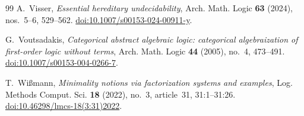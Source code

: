 \begin{thebibliography}{99}
A.~Visser, \emph{Essential hereditary undecidability},
Arch. Math. Logic \textbf{63} (2024), nos.~5--6, 529--562.
\href{https://doi.org/10.1007/s00153-024-00911-y}{doi:10.1007/s00153-024-00911-y}.

G.~Voutsadakis, \emph{Categorical abstract algebraic logic:
categorical algebraization of first-order logic without terms},
Arch. Math. Logic \textbf{44} (2005), no.~4, 473--491.
\href{https://doi.org/10.1007/s00153-004-0266-7}{doi:10.1007/s00153-004-0266-7}.

T.~Wi\ss{}mann, \emph{Minimality notions via factorization systems and examples},
Log. Methods Comput. Sci. \textbf{18} (2022),
no.~3, article~31, 31:1--31:26.
\href{https://doi.org/10.46298/lmcs-18(3:31)2022}{doi:10.46298/lmcs-18(3:31)2022}.
\end{thebibliography}
